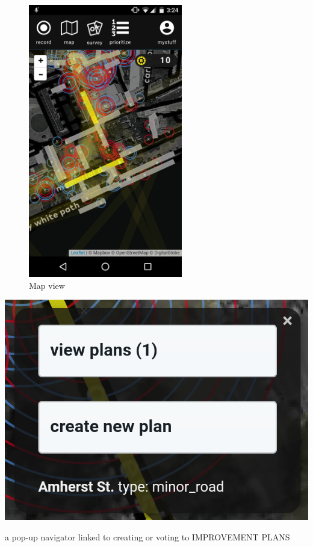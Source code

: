 \begin{figure}[htb]
  \includegraphics[width=0.6\textwidth]{chapters/4/fig/interface_map.png}               
  \caption[interface: Map]{Map view}
  \label{fig:interface_map}
\end{figure}

\begin{marginfigure}[{0cm}]
  \includegraphics{chapters/4/fig/interface_popup.png}               
  \caption[interface: Popup]{a pop-up navigator linked to creating or
  voting to IMPROVEMENT PLANS}
  \label{fig:interface_popup}
\end{marginfigure}

